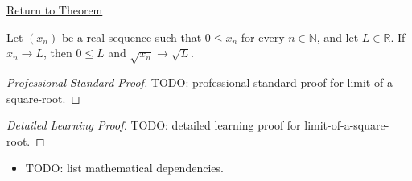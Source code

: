 \newpage
{}
\label{prf:limit-of-a-square-root}

\begin{remark*}[Return]
\hyperref[thm:limit-of-a-square-root]{Return to Theorem}
\end{remark*}

\begin{theorem*}
Let $(x_n)$ be a real sequence such that $0\le x_n$ for every
$n\in\mathbb{N}$, and let $L\in\mathbb{R}$. If $x_n\to L$, then
$0\le L$ and $\sqrt{x_n}\to\sqrt{L}$.

\smallskip
\noindent
\end{theorem*}

\begin{proof}[Professional Standard Proof]
\LRAProofBodyStart
TODO: professional standard proof for limit-of-a-square-root.
\end{proof}

\begin{proof}[Detailed Learning Proof]
\LRAProofBodyStart
TODO: detailed learning proof for limit-of-a-square-root.
\end{proof}

\begin{remark*}
\end{remark*}

\begin{dependencies}
\begin{itemize}
  \item TODO: list mathematical dependencies.
\end{itemize}
\end{dependencies}

\clearpage
